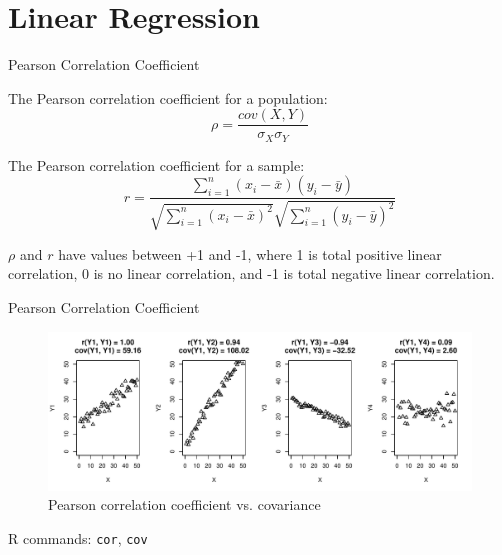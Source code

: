 \section{Linear Regression}

\begin{frame}{Pearson Correlation Coefficient}

    The Pearson correlation coefficient for a population:
    \begin{equation}
    \rho = \frac{cov(X, Y)}{\sigma_X \sigma_Y}
    \end{equation}
    
    The Pearson correlation coefficient for a sample:
    \begin{equation}
    r = \frac{\sum_{i=1}^{n}(x_i - \bar{x})(y_i - \bar{y})}{\sqrt{\sum_{i=1}^{n}(x_i - \bar{x})^2}\sqrt{\sum_{i=1}^{n}(y_i - \bar{y})^2}}
    \end{equation}
    
    $\rho$ and $r$ have values between +1 and -1, where 1 is total positive linear correlation, 0 is no linear correlation, and -1 is total negative linear correlation.
    
\end{frame}

\begin{frame}{Pearson Correlation Coefficient}
    \begin{figure}
    \includegraphics[width=\linewidth]{R/plots/pearson.pdf}
    Pearson correlation coefficient vs. covariance
    \end{figure}

    {\tiny R commands: \texttt{cor}, \texttt{cov}}
\end{frame}

